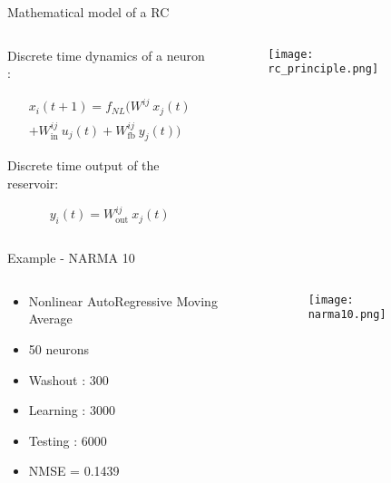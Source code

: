\begin{frame}{Mathematical model of a RC}
	\begin{columns}[T] %
	\begin{column}{.48\textwidth}
	
		Discrete time dynamics of a neuron \cite{JaegerH.2001Tesa}:
		
		\begin{multline}
			x_i (t+1) = f_{NL} \biggl( W^{ij}~x_j(t)\\ + W^{ij}_{\text{in}}~u_j(t)+W^{ij}_{\text{fb}}~y_j(t) \biggl)
		\end{multline}
		
		Discrete time output of the reservoir:
		
		\begin{equation}
			y_i(t) = W^{ij}_{\text{out}} ~x_j(t)
		\end{equation}
	
	\end{column}%
	\hfill%
	\begin{column}{.48\textwidth}
	
	\begin{figure}
		\texttt{[image: rc\_principle.png]}
		\caption{\cite{financialTimeSeries}}
	\end{figure}
	
	\end{column}%
	\end{columns}
\end{frame}

\begin{frame}{Example - NARMA 10}
	\begin{columns} %
	\begin{column}{.33\textwidth}
	
		\begin{itemize}
			\item Nonlinear AutoRegressive Moving Average
			\item 50 neurons
			\item Washout : 300
			\item Learning : 3000
			\item Testing : 6000
			\item NMSE = 0.1439
		\end{itemize}
		
	\end{column}%
	\hfill%
	\begin{column}{.63\textwidth}
		\begin{figure}
		\texttt{[image: narma10.png]}
	\end{figure}
	
	\end{column}%
	\end{columns}



\end{frame}


